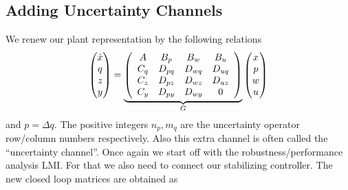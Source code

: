 \subsection{Adding Uncertainty Channels}
We renew our plant representation by the following relations
\begin{equation}
\begin{pmatrix}\dot{x}\\ q\\ z\\ y\end{pmatrix} = 
\underbrace{\left(
\begin{array}{cccc}
	A    &B_p    &B_w    &B_u\\
	C_q  &D_{pq} &D_{wq} &D_{uq}\\
	C_z  &D_{pz} &D_{wz} &D_{uz}\\
	C_y  &D_{py} &D_{wy} &0
\end{array}
\right)}_{G}
\begin{pmatrix}x\\ p\\ w\\ u\end{pmatrix}
\label{eq:genplant}
\end{equation}
and $p=\Delta q$. The positive integers $n_p,m_q$ are the uncertainty operator row/column numbers respectively. Also this extra
channel is often called the \enquote{uncertainty channel}. Once again we start off with the robustness/performance analysis LMI. 
For that we also need to connect our stabilizing controller. The new closed loop matrices are obtained as
